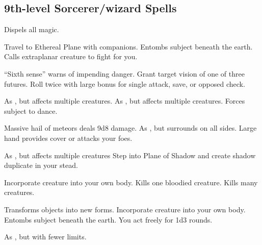 \subsection{9th-level Sorcerer/wizard Spells} 
\begin{swspelllist}
  \spellhead[Abjur]{}
   Dispels all magic.

   Travel to Ethereal Plane with companions.
   Entombs subject beneath the earth.
   Calls extraplanar creature to fight for you.
  \spellheadrestricted{}

   ``Sixth sense'' warns of impending danger.
   Grant target vision of one of three futures.
   Roll twice with large bonus for single attack, save, or opposed check.

   As , but affects multiple creatures.
   As , but affects multiple creatures.
   Forces subject to dance.

   Massive hail of meteors deals 9d8 damage.
   As , but surrounds on all sides.
   Large hand provides cover or attacks your foes.

   As , but affects multiple creatures
   Step into Plane of Shadow and create shadow duplicate in your stead.

   Incorporate creature into your own body.
   Kills one bloodied creature.
   Kills many creatures.

   Transforms objects into new forms.
   Incorporate creature into your own body.
   Entombs subject beneath the earth.
   You act freely for 1d3 rounds.

  \M As , but with fewer limits.
\end{swspelllist}

